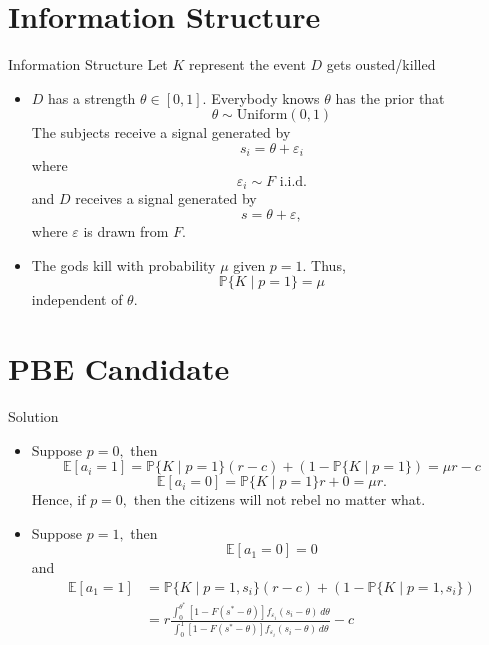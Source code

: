 \documentclass{beamer}
\newcommand{\bbP}{\mathbb{P}}
\newcommand{\bbE}{\mathbb{E}}
\begin{document}
\section{Information Structure}
\begin{frame}{Information Structure}
Let $K$ represent the event $D$ gets ousted/killed
    \begin{itemize}
        \item $D$ has a strength $\theta \in [0,1]$. Everybody knows $\theta$ has the prior that
        \[\theta \sim \text{Uniform}(0,1)\] The subjects receive a signal generated by
        \[s_i = \theta + \varepsilon_i\] where \[\varepsilon_i\sim F \text{ i.i.d.}\] 
        and $D$ receives a signal generated by 
        \[s = \theta + \varepsilon,\] where $\varepsilon$ is drawn from $F.$
        \item The gods kill with probability $\mu$ given $p = 1.$  Thus, 
        \[\bbP\{K \mid p = 1\} = \mu\] independent of $\theta.$
    \end{itemize}
\end{frame}

\section{PBE Candidate}
\begin{frame}{Solution}
\begin{itemize}
    \item Suppose $p= 0,$ then 
\[\bbE[a_i = 1] = \bbP\{K \mid p = 1\}(r-c) + (1-\bbP\{K\mid p=1\}) =\mu r - c\]
\[\bbE[a_i = 0]= \bbP\{K \mid p =1\}r + 0 = \mu r.\] Hence, if $p = 0,$ then the citizens will not rebel no matter what. 
\item Suppose $p = 1,$ then 
\[\bbE[a_1 = 0] = 0\] and 
\begin{align*}
    \bbE[a_1 = 1] &= \bbP\{K \mid p = 1, s_i\}(r-c) + (1-\bbP\{K\mid p=1, s_i\})\\
    &= r \frac{\int_0^{\theta^*}\left[1 - F(s^* - \theta)\right]f_{\varepsilon_i}(s_i - \theta)\,d\theta}{\int_0^1\left[1 - F(s^* - \theta)\right]f_{\varepsilon_i}(s_i - \theta)\,d\theta}-c
\end{align*}

\end{itemize}
\end{frame}
\end{document}
